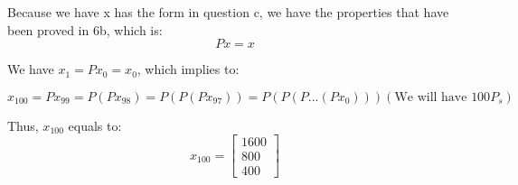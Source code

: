 \documentclass{article}
\begin{document}
\begin{enumerate}[label = ({\alph*})]
        Because we have x has the form in question c, we have the properties that have been proved in 6b, which is:
        \[Px = x\]
        
        We have \(x_{1} = Px_{0} = x_{0}\), which implies to:

        \[x_{100} = Px_{99} = P(Px_98) = P(P(Px_{97})) = P(P(P...(Px_0)))(\text{We will have } 100P_{s})\]

        Thus, \(x_{100}\) equals to:
        \[x_{100} = \begin{bmatrix}
            1600 \\
            800 \\
            400 
        \end{bmatrix}\]
    \end{enumerate}
\end{document}
